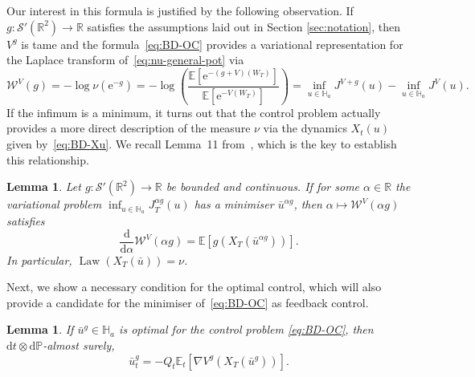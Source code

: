\documentclass[11pt, a4paper]{scrartcl}
\numberwithin{equation}{section}
\theoremstyle{plain}
\newtheorem{lemma}[foo]{Lemma}
\theoremstyle{remark}
\newcommand{\mathd}{\mathrm{d}}
\newcommand{\mathe}{\mathrm{e}}
\newcommand{\tmop}[1]{\ensuremath{\operatorname{#1}}}
\begin{document}
Our interest in this formula is justified by the following observation. If $g
	: \mathcal{S}' (\mathbb{R}^2) \rightarrow \mathbb{R}$ satisfies the
assumptions laid out in Section \ref{sec:notation}, then $V^g$ is tame and the
formula~\eqref{eq:BD-OC} provides a variational representation for the Laplace
transform of~\eqref{eq:nu-general-pot} via
\begin{equation}
	\mathcal{W}^V (g) = - \log \nu (\mathe^{- g}) = - \log \left(
	\frac{\mathbb{E} [\mathe^{- (g + V) (W_T)}]}{\mathbb{E} [\mathe^{- V
			(W_T)}]} \right) = \inf_{u \in \mathbb{H}_a} J^{V + g} (u) - \inf_{u \in
		\mathbb{H}_a} J^V (u) . \label{eq:def-WV}
\end{equation}
If the infimum is a minimum, it turns out that the control problem actually
provides a more direct description of the measure $\nu$ via the dynamics $X_t
	(u)$ given by~\eqref{eq:BD-Xu}. We recall Lemma~11
from~{\cite{barashkovVariationalMethodEuclidean2023}}, which is the key to
establish this relationship.

\begin{lemma}
	\label{lem:dda-W}Let $g : \mathcal{S}' (\mathbb{R}^2) \rightarrow
		\mathbb{R}$ be bounded and continuous. If for some $\alpha \in \mathbb{R}$
	the variational problem $\inf_{u \in \mathbb{H}_a} J_T^{\alpha g} (u)$ has a
	minimiser $\bar{u}^{\alpha g}$, then $\alpha \mapsto \mathcal{W}^V (\alpha
		g)$ satisfies
	\[ \frac{\mathd}{\mathd \alpha}  \mathcal{W}^V (\alpha g) =\mathbb{E} [g
			(X_T (\bar{u}^{\alpha g}))] . \]
	In particular, $\tmop{Law} (X_T (\bar{u})) = \nu$.
\end{lemma}

Next, we show a necessary condition for the optimal control, which will also
provide a candidate for the minimiser of~\eqref{eq:BD-OC} as feedback control.

\begin{lemma}
	\label{lem:EL-cond}If $\bar{u}^g \in \mathbb{H}_a$ is optimal for the
	control problem \eqref{eq:BD-OC}, then $\mathd t \otimes \mathd \mathbb{P}$-almost
	surely,
	\begin{equation}
		\bar{u}_t^g = - Q_t \mathbb{E}_t [\nabla V^g (X_T (\bar{u}^g))] .
		\label{eq:optimal-u}
	\end{equation}
\end{lemma}
\end{document}

